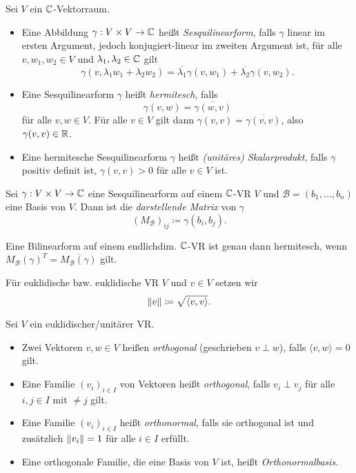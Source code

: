 \documentclass{cheat-sheet}
\newcommand{\BB}{\mathcal{B}}
\begin{document}
\begin{defn}
  Sei $V$ ein $\mathbb{C}$-Vektorraum.
  \begin{itemize}
    \item Eine Abbildung $\gamma : V \times V \to \mathbb{C}$ heißt \emph{Sesquilinearform}, falls $\gamma$ linear im ersten Argument, jedoch konjugiert-linear im zweiten Argument ist, \dh{} für alle $v, w_1, w_2 \in V$ und $\lambda_1, \lambda_2 \in \mathbb{C}$ gilt
    \[ \gamma(v, \lambda_1 w_1 + \lambda_2 w_2) = \overline{\lambda_1} \gamma(v, w_1) + \overline{\lambda_2} \gamma(v, w_2). \]
    \item Eine Sesquilinearform $\gamma$ heißt \emph{hermitesch}, falls
    \[ \gamma(v, w) = \overline{\gamma(w, v)} \]
    für alle $v, w \in V$. Für alle $v \in V$ gilt dann $\gamma(v, v) = \overline{\gamma(v, v)}$, also $\gamma(v, v) \in \mathbb{R}$.
    \item Eine hermitesche Sesquilinearform $\gamma$ heißt \emph{(unitäres) Skalarprodukt}, falls $\gamma$ positiv definit ist, \dh{} $\gamma(v, v) > 0$ für alle $v \in V$ ist.
  \end{itemize}
\end{defn}

\begin{defn}
  Sei $\gamma : V \times V \to \mathbb{C}$ eine Sesquilinearform auf einem $\mathbb{C}$-VR $V$ und $\BB = (b_1, ..., b_n)$ eine Basis von $V$. Dann ist die \emph{darstellende Matrix} von $\gamma$
  \[ (M_{\BB})_{ij} \coloneqq \gamma(b_i, b_j). \]
\end{defn}

\begin{bem}
  Eine Bilinearform auf einem endlichdim. $\mathbb{C}$-VR ist genau dann hermitesch, wenn $M_{\BB}(\gamma)^{T} = \overline{M_{\BB}(\gamma)}$ gilt. 
\end{bem}

\begin{defn}
  Für euklidische bzw. euklidische VR $V$ und $v \in V$ setzen wir
  \[ \lVert v\rVert \coloneqq \sqrt{ \langle v , v \rangle }. \]
\end{defn}

\begin{defn}
  Sei $V$ ein euklidischer/unitärer VR.
  \begin{itemize}
    \item Zwei Vektoren $v, w \in V$ heißen \emph{orthogonal} (geschrieben $v \perp w$), falls $\langle v , w \rangle = 0$ gilt.
    \item Eine Familie $(v_i)_{i \in I}$ von Vektoren heißt \emph{orthogonal}, falls $v_i \perp v_j$ für alle $i, j \in I$ mit $ \not= j$ gilt.
    \item Eine Familie $(v_i)_{i \in I}$ heißt \emph{orthonormal}, falls sie orthogonal ist und zusätzlich $\lVert v_i\rVert = 1$ für alle $i \in I$ erfüllt.
    \item Eine orthogonale Familie, die eine Basis von $V$ ist, heißt \emph{Orthonormalbasis}.
  \end{itemize}
\end{defn}
\end{document}
